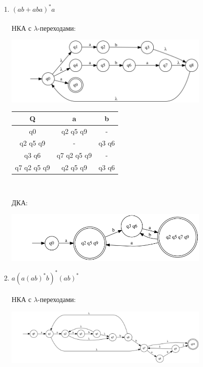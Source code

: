 \documentclass{article}
\begin{document}
\begin{enumerate}

\item {$ (a b +a b a)^*a $} \\ \\
НКА с $\lambda$-переходами:
\begin{center}
    \includegraphics[width=0.8\textwidth]{g31_nka.png}
\end{center}

\begin{center}
    \begin{tabular}{|c|c|c|}
        \hline
        Q & a & b \\
        \hline
        q0 & q2 q5 q9 & - \\
        \hline
        q2 q5 q9 & - & q3 q6 \\
        \hline
        q3 q6 & q7 q2 q5 q9 & - \\
        \hline
        q7 q2 q5 q9 & q2 q5 q9 & q3 q6 \\
        \hline
    \end{tabular}\\
\end{center}
    
ДКА:
\begin{center}
    \includegraphics[width=0.8\textwidth]{g31.png} \\
\end{center}

\item {$ a(a(ab)^*b)^*(ab)^* $} \\ \\
НКА с $\lambda$-переходами:
\begin{center}
    \includegraphics[width=0.8\textwidth]{g32_nka.png}
\end{center}

\end{enumerate}
\end{document}
